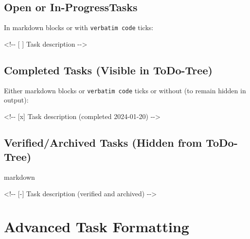 \documentclass[
  11pt,
  letterpaper,
]{book}
\newenvironment{Shaded}{\begin{snugshade}}{\end{snugshade}}
\newcommand{\CommentTok}[1]{\textcolor[rgb]{0.37,0.37,0.37}{#1}}
\begin{document}

\subsection*{Open or In-ProgressTasks}\label{open-or-in-progresstasks}

In markdown blocks or with \texttt{verbatim\ code} ticks:

\begin{Shaded}
\begin{Highlighting}[]
\CommentTok{\textless{}!{-}{-} [ ] Task description {-}{-}\textgreater{}}
\end{Highlighting}
\end{Shaded}

\subsection*{Completed Tasks (Visible in
ToDo-Tree)}\label{completed-tasks-visible-in-todo-tree}

Either markdown blocks or \texttt{verbatim\ code} ticks or without (to
remain hidden in output):

\begin{Shaded}
\begin{Highlighting}[]
\CommentTok{\textless{}!{-}{-} [x] Task description (completed 2024{-}01{-}20) {-}{-}\textgreater{}}
\end{Highlighting}
\end{Shaded}

\subsection*{Verified/Archived Tasks (Hidden from
ToDo-Tree)}\label{verifiedarchived-tasks-hidden-from-todo-tree}

markdown

\begin{Shaded}
\begin{Highlighting}[]
\CommentTok{\textless{}!{-}{-} [{-}] Task description (verified and archived) {-}{-}\textgreater{}}
\end{Highlighting}
\end{Shaded}

\section*{Advanced Task Formatting}\label{advanced-task-formatting}
\end{document}
